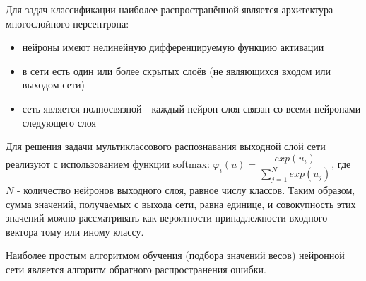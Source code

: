 

Для задач классификации наиболее распространённой является архитектура многослойного персептрона:

\begin{itemize}
\item нейроны имеют нелинейную дифференцируемую функцию активации
\item в сети есть один или более скрытых слоёв (не являющихся входом или выходом сети)
\item сеть является полносвязной - каждый нейрон слоя связан со всеми нейронами следующего слоя
\end{itemize}

Для решения задачи мультиклассового распознавания выходной слой сети реализуют с использованием функции softmax: $\varphi_i(u)=\dfrac{exp(u_i)}{\sum_{j=1}^N exp(u_j)}$, где $N$ - количество нейронов выходного слоя, равное числу классов. Таким образом, сумма значений, получаемых с выхода сети, равна единице, и совокупность этих значений можно рассматривать как вероятности принадлежности входного вектора тому или иному классу.

Наиболее простым алгоритмом обучения (подбора значений весов) нейронной сети является алгоритм обратного распространения ошибки.


